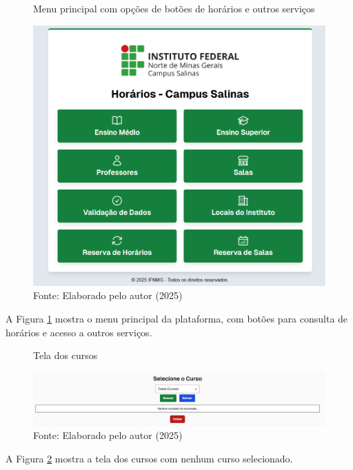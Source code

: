 \begin{figure}[htb]
    \centering
    \caption{Menu principal com opções de botões de horários e outros serviços}
    \includegraphics[width=1\textwidth]{Figuras/front-1.png}
    \caption*{Fonte: Elaborado pelo autor (2025)}
    \label{fig_front_1}
\end{figure}

A Figura \ref{fig_front_1} mostra o menu principal da plataforma, com botões para consulta de horários e acesso a outros serviços.

\begin{figure}[htb]
    \centering
    \caption{Tela dos cursos}
    \includegraphics[width=1\textwidth]{Figuras/front-2.png}
    \caption*{Fonte: Elaborado pelo autor (2025)}
    \label{fig_front_2}
\end{figure}

A Figura \ref{fig_front_2} mostra a tela dos cursos com nenhum curso selecionado.

